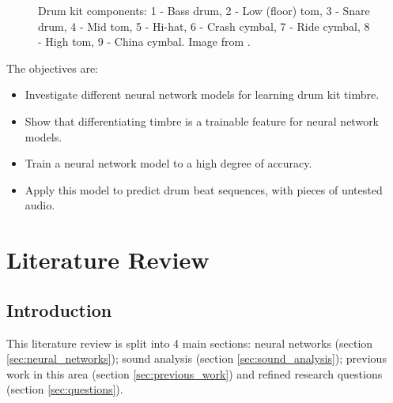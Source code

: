 \documentclass[12pt]{article}
\begin{document}
	\begin{figure}[H]
        \centering
        \caption{\footnotesize{Drum kit components: 1 - Bass drum, 2 - Low (floor) tom, 3 - Snare drum, 4 - Mid tom, 5 - Hi-hat, 6 - Crash cymbal, 7 - Ride cymbal, 8 - High tom, 9 - China cymbal. Image from \parencite{drumschematic}.}}
        \label{fig:drum_schematic}
    \end{figure}
    
    The objectives are:
    
    \begin{itemize}
	    \item Investigate different neural network models for learning drum kit timbre.
	    \item Show that differentiating timbre is a trainable feature for neural network models.
	    \item Train a neural network model to a high degree of accuracy.
	    \item Apply this model to predict drum beat sequences, with pieces of untested audio.
	\end{itemize}
	
	\newpage
	\section{Literature Review}
	\label{sec:literature_review}
    
    \setcounter{subsection}{-1}
	\subsection{Introduction}
	\label{sec:lit_review_intro}
	This literature review is split into 4 main sections: neural networks (section \ref{sec:neural_networks}); sound analysis (section \ref{sec:sound_analysis}); previous work in this area (section \ref{sec:previous_work}) and refined research questions (section \ref{sec:questions}).
	\medskip
	
\end{document}
